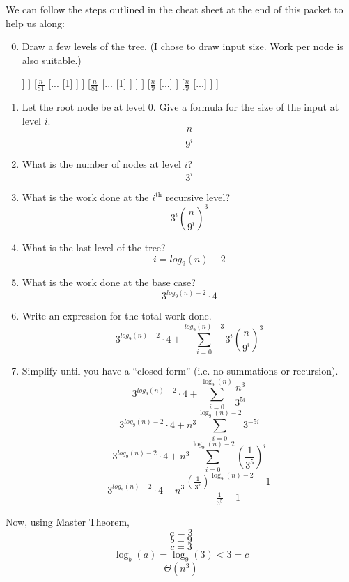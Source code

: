 \documentclass[12pt]{article}
\begin{document}
\begin{tcolorbox}
We can follow the steps outlined in the cheat sheet at the end of this packet to help us along:
\begin{enumerate}
	\setcounter{enumi}{-1}
	\item Draw a few levels of the tree.
	(I chose to draw input size. Work per node is also suitable.)
	\begin{center}
	\begin{forest}
	[n
		[$\frac{n}{9}$
			[$\frac{n}{81}$
				[...
					[1]
				]
			]
			[$\frac{n}{81}$
				[...
					[1]
				]
			]
			[$\frac{n}{81}$
				[...
					[1]
				]
			]
		]
		[$\frac{n}{9}$
			[...]
		]
		[$\frac{n}{9}$
			[...]
		]
	]
	\end{forest}
	\end{center}
\end{enumerate}
\end{tcolorbox}
\newpage
\begin{tcolorbox}
\begin{enumerate}
	\setcounter{enumi}{0}
	\item Let the root node be at level $0$. Give a formula for the size of the input at level $i$. 
	$$\frac{n}{9^i}$$
	\item What is the number of nodes at level $i$? 
	$$3^i$$
	\item What is the work done at the $i^{\text{th}}$ recursive level? 
	$$3^i(\frac{n}{9^i})^3$$
	\item What is the last level of the tree? 
	$$i=log_9(n)-2$$
	\item What is the work done at the base case? 
	$$3^{log_9(n)-2}\cdot4$$
	\item Write an expression for the total work done. 
	$$3^{log_9(n)-2}\cdot4 + \sum_{i=0}^{log_9(n)-3} 3^i(\frac{n}{9^i})^3 $$
	\item Simplify until you have a ``closed form'' (i.e. no summations or recursion).
	$$3^{log_9(n)-2}\cdot4 + \sum_{i=0}^{\log_9(n)} \frac{n^3}{3^{5i}} $$
	$$3^{log_9(n)-2}\cdot4 + n^3\sum_{i=0}^{\log_9(n)-2} 3^{-5i} $$ 
	$$3^{log_9(n)-2}\cdot4 + n^3\sum_{i=0}^{\log_9(n)-2} (\frac{1}{3^5})^i $$ 
	$$3^{log_9(n)-2}\cdot4 + n^3\frac{(\frac{1}{3^5})^{\log_9(n)-2}-1}{\frac{1}{3^5}-1} $$
\end{enumerate}
\end{tcolorbox}
\newpage
\begin{tcolorbox}
Now, using Master Theorem,
$$a=3$$
$$b=9$$
$$c=3$$
$$\log_b(a)=\log_9(3)<3=c$$
$$\Theta(n^3)$$
\end{tcolorbox}
\end{document}
